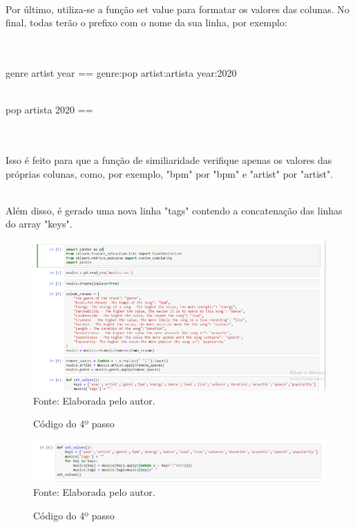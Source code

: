 \documentclass[a4paper, 12pt]{article}
\begin{document}
\\Por último, utiliza-se a função set value para formatar os valores das colunas. No final, todas terão o prefixo com o nome da sua linha, por exemplo:

\\\\genre artist year == genre:pop artist:artista year:2020

\\pop artista 2020 ==

\\\\Isso é feito para que a função de similiaridade verifique apenas os valores das próprias colunas, como, por exemplo, "bpm" por "bpm" e "artist" por "artist".

\\Além disso, é gerado uma nova linha "tags" contendo a concatenação das linhas do array "keys".

 \begin{figure}[!ht]
        \centering
        \caption{Código do 4º passo}
        \includegraphics[scale=0.5]{4passo.png} \\
        {\footnotesize Fonte: Elaborada pelo autor.}
        \label{fig:my_label}
    \end{figure}

     \begin{figure}[!ht]
        \centering
        \caption{Código do 4º passo}
        \includegraphics[scale=0.5]{4passo2.png} \\
        {\footnotesize Fonte: Elaborada pelo autor.}
        \label{fig:my_label}
    \end{figure}
\end{document}
